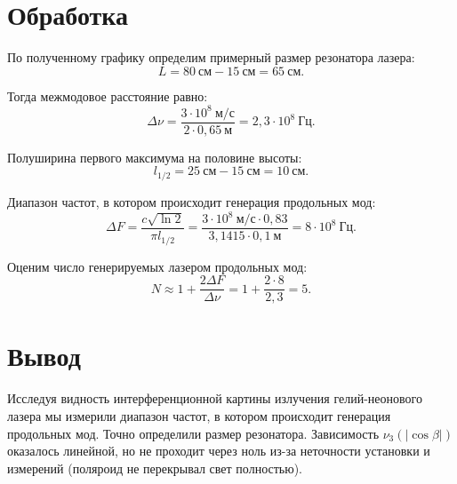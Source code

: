 \documentclass{MagicLabs}
\begin{document}
\section{Обработка}
По полученному графику определим примерный размер резонатора лазера: 
\[
	L = 80~см- 15~см = 65~см.
\]

Тогда межмодовое расстояние равно: 
\[
	\Delta\nu = \dfrac{3 \cdot 10^8~м/с}{2\cdot 0,65~м} = 2,3 \cdot 10^8~Гц.
\]


Полуширина первого максимума на половине высоты:
\[
	l_{1/2} = 25~см - 15~см = 10~см.
\]


Диапазон частот, в котором происходит генерация продольных мод:
\[
	\Delta F = \dfrac{c\sqrt{\ln2}}{\pi l_{1/2}} = \dfrac{3\cdot 10^8~м/с\cdot0,83}{3,1415\cdot0,1~м} =
	 8\cdot10^8~Гц.
\]


Оценим число генерируемых лазером продольных мод:
\[
	N\approx 1 + \dfrac{2\Delta F}{\Delta\nu} = 1 + \dfrac{2\cdot 8}{2,3} = 5.
\]
	

\section{Вывод}
Исследуя видность интерференционной картины излучения гелий-неонового лазера мы измерили
диапазон частот, в котором происходит генерация продольных мод. Точно определили размер резонатора. Зависимость $ \nu_3(|\cos\beta|) $ оказалось линейной, но не проходит
через ноль из-за неточности установки и измерений (поляроид не перекрывал свет полностью).	
\end{document}
